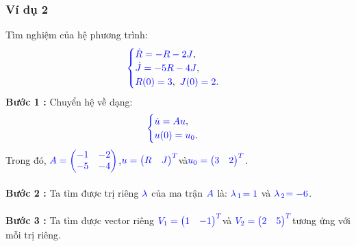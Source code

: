 \documentclass[a4paper]{article}
\begin{document}
\subsubsection{Ví dụ 2}
Tìm nghiệm của hệ phương trình:
\begin{align}
	    \textcolor{blue}{
	    \begin{cases}
            \dot R = -R - 2J \textcolor{black}{,}\\
            \dot J = -5R - 4J \textcolor{black}{,}\\
            R(0) = 3\textcolor{black}{,} \enskip J(0) = 2 \textcolor{black}{.}
        \end{cases}
        }
        \notag
	\end{align}
{\bfseries Bước 1 :} Chuyển hệ về dạng:
\begin{align}
	    \textcolor{blue}{
	    \begin{cases}
            \dot u = Au \textcolor{black}{,}\\
            u(0) = u\sb{0}\textcolor{black}{.}
        \end{cases}
        }
        \notag
	\end{align}
Trong đó,  $\textcolor{blue}{A = \begin{pmatrix} -1 & -2\\ -5 & -4 \end{pmatrix}}$,\enskip $\textcolor{blue}{u = \begin{pmatrix} R & J \end{pmatrix}\sp{T}}$\enskip và\enskip $\textcolor{blue}{u\sb{0} = \begin{pmatrix} 3 & 2 \end{pmatrix}\sp{T}}$.\\\\
{\bfseries Bước 2 :} Ta tìm được trị riêng $\textcolor{blue}{\lambda}$ của ma trận $\textcolor{blue}{A}$ là: $\textcolor{blue}{\lambda}$$\textcolor{blue}{\sb{1}}$$\textcolor{blue}{=1}$ và $\textcolor{blue}{\lambda}$$\textcolor{blue}{\sb{2}}$$\textcolor{blue}{=-6}$.\\\\
{\bfseries Bước 3 :} Ta tìm được vector riêng \enskip $\textcolor{blue}{V\sb{1} = \begin{pmatrix} 1 & -1 \end{pmatrix}\sp{T}}$\enskip và \enskip $\textcolor{blue}{V\sb{2} = \begin{pmatrix} 2 & 5 \end{pmatrix}\sp{T}}$\enskip tương ứng với mỗi trị riêng.\\\\
\end{document}
